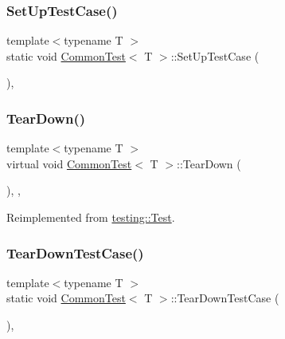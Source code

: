 \subsubsection{\texorpdfstring{Set\+Up\+Test\+Case()}{SetUpTestCase()}}
{\footnotesize\ttfamily template$<$typename T $>$ \\
static void \hyperlink{class_common_test}{Common\+Test}$<$ T $>$\+::Set\+Up\+Test\+Case (\begin{DoxyParamCaption}{ }\end{DoxyParamCaption})\hspace{0.3cm}{\ttfamily [inline]}, {\ttfamily [static]}}

\mbox{\label{class_common_test_aeae195c2cefa956c6ae5be1226e6ecd8}} 
\subsubsection{\texorpdfstring{Tear\+Down()}{TearDown()}}
{\footnotesize\ttfamily template$<$typename T $>$ \\
virtual void \hyperlink{class_common_test}{Common\+Test}$<$ T $>$\+::Tear\+Down (\begin{DoxyParamCaption}{ }\end{DoxyParamCaption})\hspace{0.3cm}{\ttfamily [inline]}, {\ttfamily [protected]}, {\ttfamily [virtual]}}



Reimplemented from \hyperlink{classtesting_1_1_test_a5f0ab439802cbe0ef7552f1a9f791923}{testing\+::\+Test}.

\mbox{\label{class_common_test_a68d2bf5108cf28478331588fbdff4838}} 
\subsubsection{\texorpdfstring{Tear\+Down\+Test\+Case()}{TearDownTestCase()}}
{\footnotesize\ttfamily template$<$typename T $>$ \\
static void \hyperlink{class_common_test}{Common\+Test}$<$ T $>$\+::Tear\+Down\+Test\+Case (\begin{DoxyParamCaption}{ }\end{DoxyParamCaption})\hspace{0.3cm}{\ttfamily [inline]}, {\ttfamily [static]}}



